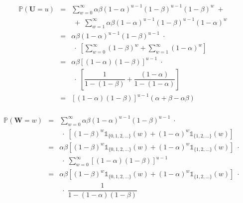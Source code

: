 \documentclass[a4paper, 11pt]{article}
\begin{document}
\begin{equation*}
\begin{array}{lclll}

\mathds{P}(\mathbf{U} = u) & = & \displaystyle\sum_{w=0}^{\infty} \alpha\beta (1-\alpha)^{u-1} (1-\beta)^{u-1}(1-\beta)^{w} \; + \; \\ 
&  & \; + \; \displaystyle\sum_{w=1}^{\infty} \alpha\beta (1-\alpha)^{u-1} (1-\beta)^{u-1}(1-\alpha)^{w}\\

& = & \alpha\beta(1-\alpha)^{u-1}(1-\beta)^{u-1} \; \cdot \; \\ 
&  & \; \cdot \;  \left[\displaystyle\sum_{w=0}^{\infty}(1-\beta)^{w} +  \displaystyle\sum_{w=1}^{\infty} (1-\alpha)^{w} \right] \\

& = & \alpha\beta\left[(1-\alpha)(1-\beta)\right]^{u-1} \; \cdot \; \\ 
&  & \; \cdot \;  \left[\dfrac{1}{1-(1-\beta)} + \dfrac{(1-\alpha)}{1-(1-\alpha)} \right] \\

& = & \left[(1-\alpha)(1-\beta)\right]^{u-1}(\alpha + \beta - \alpha\beta)  \\[25pt]

\end{array}
\end{equation*}

\begin{equation*}
\begin{array}{lclll}
\mathds{P}(\mathbf{W} = w) & = & \displaystyle\sum_{w=0}^{\infty} \alpha\beta (1-\alpha)^{u-1} (1-\beta)^{u-1}  \; \cdot \; \\ 
&  & \; \cdot \;  \left[(1-\beta)^{w} \mathds{1}_{\{0,1,2,\ldots\}}(w) + (1-\alpha)^{w} \mathds{1}_{\{1,2,\ldots\}}(w) \right] \\

& = & \alpha\beta \left[(1-\beta)^{w} \mathds{1}_{\{0,1,2,\ldots\}}(w) + (1-\alpha)^{w} \mathds{1}_{\{1,2,\ldots\}}(w) \right] \; \cdot \; \\ 
&  & \; \cdot \;  \displaystyle\sum_{w=0}^{\infty}\left[(1-\alpha)(1-\beta)\right]^{u-1}  \\

& = & \alpha\beta \left[(1-\beta)^{w} \mathds{1}_{\{0,1,2,\ldots\}}(w) + (1-\alpha)^{w} \mathds{1}_{\{1,2,\ldots\}}(w) \right] \; \cdot \; \\ 
&  & \; \cdot \;  \dfrac{1}{1-(1-\alpha)(1-\beta)} \\[25pt]

\end{array}
\end{equation*}
\end{document}
